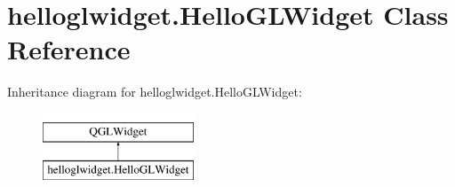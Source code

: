 \hypertarget{classhelloglwidget_1_1HelloGLWidget}{}\section{helloglwidget.\+Hello\+G\+L\+Widget Class Reference}
\label{classhelloglwidget_1_1HelloGLWidget}
Inheritance diagram for helloglwidget.\+Hello\+G\+L\+Widget\+:\begin{figure}[H]
\begin{center}
\leavevmode
\includegraphics[height=2.000000cm]{classhelloglwidget_1_1HelloGLWidget}
\end{center}
\end{figure}
